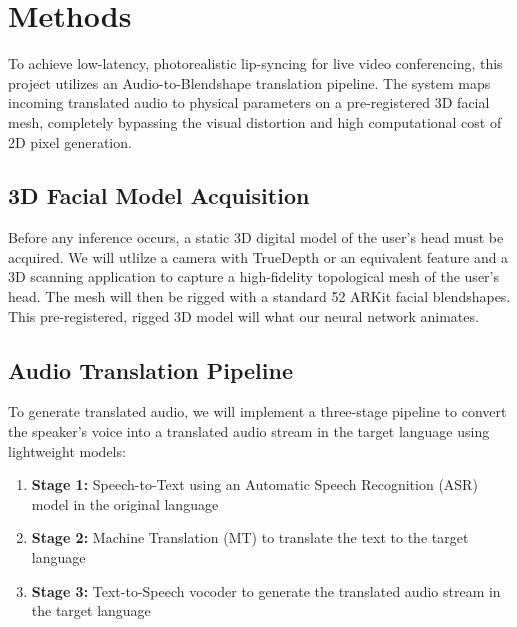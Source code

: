 \section{Methods}

To achieve low-latency, photorealistic lip-syncing for live video conferencing, this project utilizes an Audio-to-Blendshape translation pipeline. The system maps incoming translated audio to physical parameters on a pre-registered 3D facial mesh, completely bypassing the visual distortion and high computational cost of 2D pixel generation.

\subsection{3D Facial Model Acquisition}
Before any inference occurs, a static 3D digital model of the user's head must be acquired. We will utlilze a camera with TrueDepth or an equivalent feature and a 3D scanning application to capture a high-fidelity topological mesh of the user's head. The mesh will then be rigged with a standard 52 ARKit facial blendshapes. This pre-registered, rigged 3D model will what our neural network animates.
\subsection{Audio Translation Pipeline}
To generate translated audio, we will implement a three-stage pipeline to convert the speaker's voice into a translated audio stream in the target language using lightweight models:
\begin{enumerate}
    \item \textbf{Stage 1:} Speech-to-Text using an Automatic Speech Recognition (ASR) model in the original language
    \item \textbf{Stage 2:} Machine Translation (MT) to translate the text to the target language
    \item \textbf{Stage 3:} Text-to-Speech vocoder to generate the translated audio stream in the target language
\end{enumerate}

